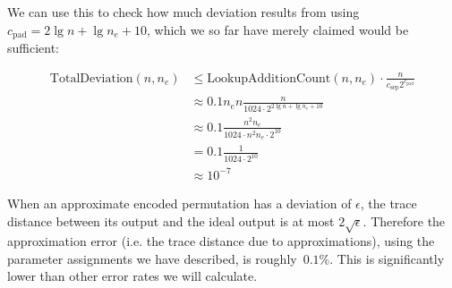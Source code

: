 \documentclass[a4paper, onecolumn, accepted=2021-03-29]{quantumarticle}
\newcommand{\lenexp}{{n_e}}
\newcommand{\gsep}{{c_{\text{sep}}}}
\newcommand{\gpad}{{c_{\text{pad}}}}
\begin{document}
We can use this to check how much deviation results from using $\gpad = 2 \lg n + \lg \lenexp + 10$, which we so far have merely claimed would be sufficient:

\begin{equation}
\begin{aligned}
    \text{TotalDeviation}(n, \lenexp)
    &\leq \text{LookupAdditionCount}(n, \lenexp) \cdot \frac{n}{\gsep 2^{\gpad}}
    \\&\approx 0.1 \lenexp n \frac{n}{1024 \cdot 2^{2 \lg n + \lg \lenexp + 10}}
    \\&\approx 0.1 \frac{n^2 \lenexp}{1024 \cdot n^2 \lenexp \cdot 2^{10}}
    \\&= 0.1 \frac{1}{1024 \cdot 2^{10}}
    \\&\approx 10^{-7}
\end{aligned}
\end{equation}

When an approximate encoded permutation has a deviation of $\epsilon$, the trace distance between its output and the ideal output is at most $2 \sqrt{\epsilon}$.
Therefore the approximation error (i.e. the trace distance due to approximations), using the parameter assignments we have described, is roughly~$0.1\%$.
This is significantly lower than other error rates we will calculate.
\end{document}
